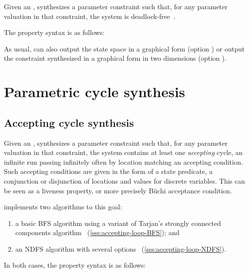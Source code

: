 Given an \NIPTA{}, \PDFC{} synthesizes a parameter constraint such that, for any parameter valuation in that constraint, the system is deadlock-free~\cite{Andre16}.

The property syntax is as follows:


As usual, \imitator{} can also
output the state space in a graphical form (option )
or
output the constraint synthesized in a graphical form in two dimensions (option ).


\section{Parametric cycle synthesis}\label{ss:mode:LoopSynth}


\subsection{Accepting cycle synthesis}\label{ss:accepting-loop}
Given an \NIPTA{}, \imitator{} synthesizes a parameter constraint such that, for any parameter valuation in that constraint, the system contains at least one \emph{accepting} cycle, \ie{} an infinite run passing infinitely often by location matching an accepting condition.
Such accepting conditions are given in the form of a state predicate, \ie{} a conjunction or disjunction of locations and values for discrete variables.
This can be seen as a liveness property, or more precisely Büchi acceptance condition.

\imitator{} implements two algorithms to this goal:
\begin{enumerate}
	\item a basic BFS algorithm using a variant of Tarjan's strongly connected components algorithm~\cite{AAPP21} (\cref{sss:accepting-loop-BFS}); and
	\item an NDFS algorithm with several options~\cite{NPP18,AAPP21} (\cref{sss:accepting-loop-NDFS}).
\end{enumerate}

In both cases, the property syntax is as follows:

